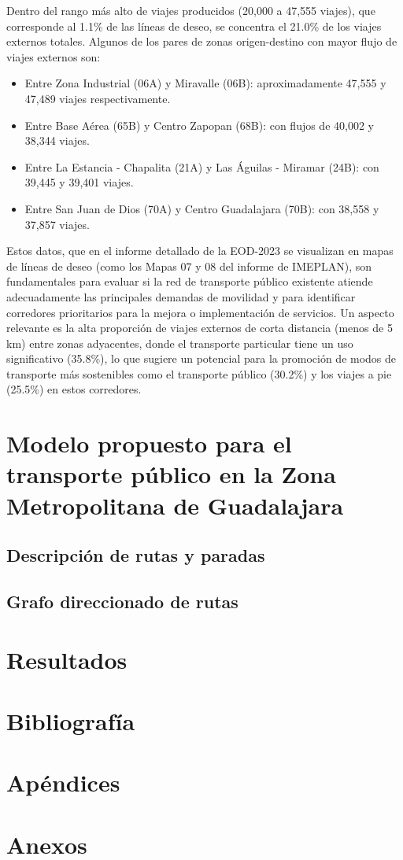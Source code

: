 \documentclass[openany]{book}
\begin{document}
            Dentro del rango más alto de viajes producidos (20,000 a 47,555 viajes), que corresponde al 1.1\% de las líneas de deseo, se concentra el 21.0\% de los viajes externos totales. Algunos de los pares de zonas origen-destino con mayor flujo de viajes externos son:
            \begin{itemize}
                \item Entre Zona Industrial (06A) y Miravalle (06B): aproximadamente 47,555 y 47,489 viajes respectivamente.
                \item Entre Base Aérea (65B) y Centro Zapopan (68B): con flujos de 40,002 y 38,344 viajes.
                \item Entre La Estancia - Chapalita (21A) y Las Águilas - Miramar (24B): con 39,445 y 39,401 viajes.
                \item Entre San Juan de Dios (70A) y Centro Guadalajara (70B): con 38,558 y 37,857 viajes.
            \end{itemize}
            Estos datos, que en el informe detallado de la EOD-2023 se visualizan en mapas de líneas de deseo (como los Mapas 07 y 08 del informe de IMEPLAN), son fundamentales para evaluar si la red de transporte público existente atiende adecuadamente las principales demandas de movilidad y para identificar corredores prioritarios para la mejora o implementación de servicios. Un aspecto relevante es la alta proporción de viajes externos de corta distancia (menos de 5 km) entre zonas adyacentes, donde el transporte particular tiene un uso significativo (35.8\%), lo que sugiere un potencial para la promoción de modos de transporte más sostenibles como el transporte público (30.2\%) y los viajes a pie (25.5\%) en estos corredores.


\chapter{Modelo propuesto para el transporte público en la Zona Metropolitana de Guadalajara}
	\section{Descripción de rutas y paradas}
	\section{Grafo direccionado de rutas}

\chapter{Resultados}

\chapter{Bibliografía}

\chapter{Apéndices}

\chapter{Anexos}
\end{document}
